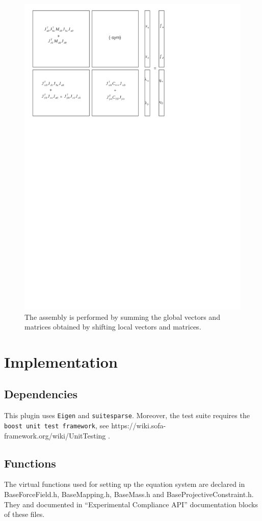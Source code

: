 \begin{figure}
\centering
 \includegraphics[clip,trim=5mm 185mm 70mm 5mm,width=0.6\linewidth]{system-assembly.pdf}
\caption{The assembly is performed by summing the global vectors and matrices obtained by shifting local vectors and matrices.}
\label{fig assembly}
\end{figure}


\section{Implementation} \label{sec implementation}

\subsection{Dependencies}
This plugin uses \texttt{Eigen} and \texttt{suitesparse}. Moreover, the test suite requires the \texttt{boost unit test framework}, see https://wiki.sofa-framework.org/wiki/UnitTesting  .

\subsection{Functions}

The virtual functions used for setting up the equation system are declared in BaseForceField.h, BaseMapping.h, BaseMass.h and BaseProjectiveConstraint.h.
They and documented in ``Experimental Compliance API'' documentation blocks of these files.


